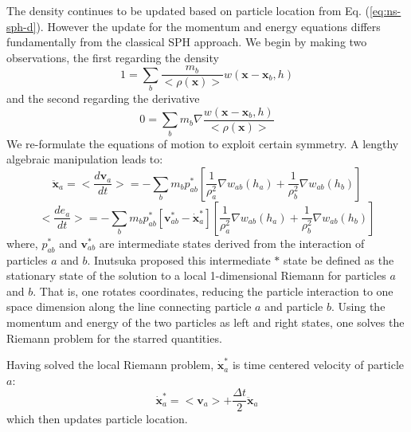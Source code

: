 \documentclass[preprint,12pt,authoryear]{elsarticle}
\begin{document}
The density continues to be updated based on particle location from Eq. (\ref{eq:ns-sph-d}). However the update for the momentum and energy equations differs fundamentally from the classical SPH approach. We begin by making two observations, the first regarding the density
\begin{equation}
1=\sum_{b} \frac{m_{b}}{<\rho(\textbf{x})>}w(\textbf{x} - \textbf{x}_{b}, h)
\label{eq:GSPH-basic1}
\end{equation}
and the second regarding the derivative 
\begin{equation}
0=\sum_{b} m_{b} \nabla \frac{w(\textbf{x} - \textbf{x}_{b}, h)}{<\rho(\textbf{x})>}
\label{eq:GSPH-basic2}
\end{equation}
We re-formulate the equations of motion to exploit certain symmetry. A lengthy algebraic manipulation \citep{inutsuka2002reformulation,iwasaki2011smoothed} leads to:
\begin{equation}
\ddot{\textbf{x}}_{a} = <\dfrac{d \textbf{v}_{a}}{dt}>= -\sum_{b} m_{b} p_{a b}^{\ast} \left[\frac{1}{\rho_{a}^2} \nabla w_{a b}(h_{a}) + \frac{1}{\rho_{b}^2} \nabla w_{a b}(h_{b}) \right]
\label{eq:gov-gsph-v-simple-form}
\end{equation}
\begin{equation}
<\dfrac{d e_{a}}{dt}>= - \sum_{b} m_{b} p_{a b}^{\ast} [\textbf{v}_{a b}^{\ast} - \dot{\textbf{x}}_{a}^{\ast}] \left[\frac{1}{\rho_{a}^2} \nabla w_{a b}(h_{a}) + \frac{1}{\rho_{b}^2} \nabla w_{a b}(h_{b}) \right]
\label{eq:gov-gsph-e-simple-form}
\end{equation}
where, $p_{a b}^{\ast}$ and $\textbf{v}_{a b}^{\ast}$ are intermediate states derived from the interaction of particles $a$ and $b$. Inutsuka proposed this intermediate $\ast$ state be defined as the stationary state of the solution to a local 1-dimensional Riemann for particles $a$ and $b$.  That is, one rotates coordinates, reducing the particle interaction to one space dimension along the line connecting particle $a$ and particle $b$. Using the momentum and energy of the two particles as left and right states, one solves the Riemann problem for the starred quantities.

Having solved the local Riemann problem, 
$\dot{\textbf{x}}_{a}^{\ast}$ is time centered velocity of particle $a$:
\begin{equation}
\dot{\textbf{x}}_{a}^{\ast} = <\textbf{v}_{a}> + \frac{\Delta t}{2} \ddot{\textbf{x}}_{a}
\end{equation}
which then updates particle location.
\end{document}
